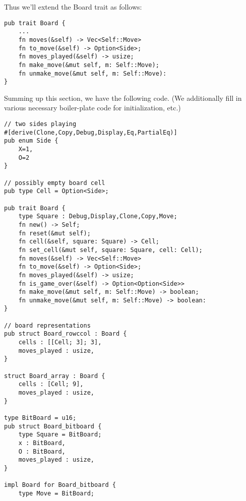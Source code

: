 \documentclass[10pt,dvipdfmx,letterpaper]{report}
\begin{document}
Thus we'll extend the Board trait as follows:
{\scriptsize
\begin{verbatim}
pub trait Board {
    ...
    fn moves(&self) -> Vec<Self::Move>
    fn to_move(&self) -> Option<Side>;
    fn moves_played(&self) -> usize;
    fn make_move(&mut self, m: Self::Move);
    fn unmake_move(&mut self, m: Self::Move):
}
\end{verbatim}
}

Summing up this section, we have the following code.
(We additionally fill in various necessary boiler-plate code for initialization, etc.)
{\scriptsize
\begin{verbatim}
// two sides playing
#[derive(Clone,Copy,Debug,Display,Eq,PartialEq)]
pub enum Side {
    X=1,
    O=2
}

// possibly empty board cell
pub type Cell = Option<Side>;

pub trait Board {
    type Square : Debug,Display,Clone,Copy,Move;
    fn new() -> Self;
    fn reset(&mut self);
    fn cell(&self, square: Square) -> Cell;
    fn set_cell(&mut self, square: Square, cell: Cell);
    fn moves(&self) -> Vec<Self::Move>
    fn to_move(&self) -> Option<Side>;
    fn moves_played(&self) -> usize;
    fn is_game_over(&self) -> Option<Option<Side>>
    fn make_move(&mut self, m: Self::Move) -> boolean;
    fn unmake_move(&mut self, m: Self::Move) -> boolean:
}

// board representations
pub struct Board_rowccol : Board {
    cells : [[Cell; 3]; 3],
    moves_played : usize,
}

struct Board_array : Board {
    cells : [Cell; 9],
    moves_played : usize,
}

type BitBoard = u16;
pub struct Board_bitboard {
    type Square = BitBoard;
    x : BitBoard,
    O : BitBoard,
    moves_played : usize,
}

impl Board for Board_bitboard {
    type Move = BitBoard;


\end{verbatim}}
\end{document}
